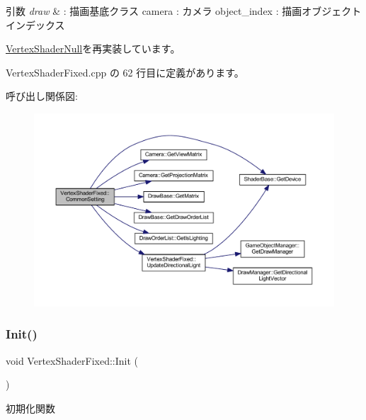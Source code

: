 \begin{DoxyParams}{引数}
{\em draw} & \+: 描画基底クラス camera \+: カメラ object\+\_\+index \+: 描画オブジェクトインデックス \\
\hline
\end{DoxyParams}


\mbox{\hyperlink{class_vertex_shader_null_a95f1a66045fb39c42cf0566f1990b6a1}{Vertex\+Shader\+Null}}を再実装しています。



 Vertex\+Shader\+Fixed.\+cpp の 62 行目に定義があります。

呼び出し関係図\+:\nopagebreak
\begin{figure}[H]
\begin{center}
\leavevmode
\includegraphics[width=350pt]{class_vertex_shader_fixed_a82bf2829b6fd0df26faedcbf650ba08d_cgraph}
\end{center}
\end{figure}
\mbox{\label{class_vertex_shader_fixed_ae829ff736b33c45543804059255125b6}} 
\subsubsection{\texorpdfstring{Init()}{Init()}}
{\footnotesize\ttfamily void Vertex\+Shader\+Fixed\+::\+Init (\begin{DoxyParamCaption}{ }\end{DoxyParamCaption})\hspace{0.3cm}{\ttfamily [virtual]}}



初期化関数 



